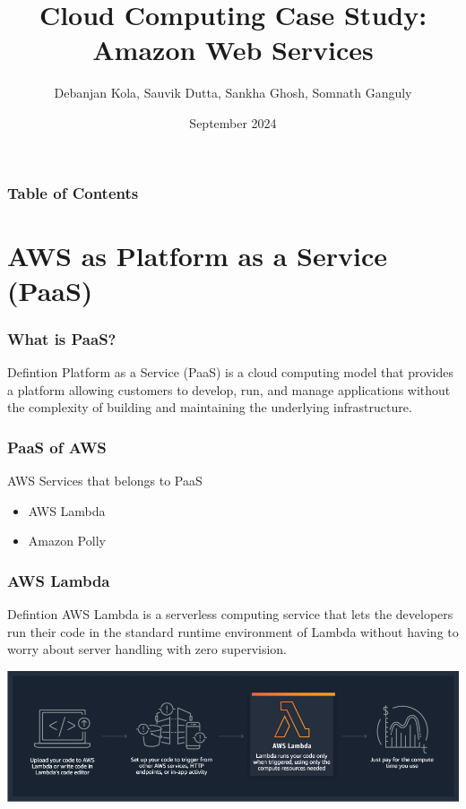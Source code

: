 \documentclass{beamer}
\title[]{Cloud Computing Case Study: Amazon Web Services}
\author[]{Debanjan Kola, Sauvik Dutta, Sankha Ghosh, Somnath Ganguly}
\institute[]{
  Department of Computer Science\\
  Ramakrishna Mission Vivekananda Centenary College
}
\date[]{September 2024}
\begin{document}
\frame{\titlepage}


\begin{frame}
\frametitle{Table of Contents}
\tableofcontents
\end{frame}



\section{AWS as Platform as a Service (PaaS)}

\begin{frame}
\frametitle{What is PaaS?}
\begin{block}{Defintion}
	Platform as a Service (PaaS) is a cloud computing model that provides a platform allowing customers to develop, run, and manage applications without the complexity of building and maintaining the underlying infrastructure.
\end{block}
\end{frame}


\begin{frame}
	\frametitle{PaaS of AWS}
	\begin{examples}{AWS Services that belongs to PaaS}
		\begin{itemize}
			\item AWS Lambda
			\item Amazon Polly
		\end{itemize}
	\end{examples}		
\end{frame}

\begin{frame}
	\frametitle{AWS Lambda}
	\begin{block}{Defintion}
		AWS Lambda is a serverless computing service that lets the developers run their code in the standard runtime environment of Lambda without having to worry about server handling with zero supervision.
	\end{block}
	
	\begin{center}
	
	\includegraphics[scale=0.35]{product-page-diagram_Lambda-HowItWorks.68a0bcacfcf46fccf04b97f16b686ea44494303f.png}
	\end{center}
\end{frame}
\end{document}

